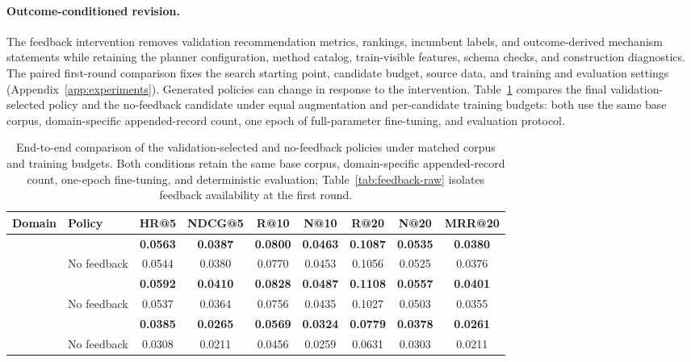 \paragraph{Outcome-conditioned revision.}
The feedback intervention removes validation recommendation metrics, rankings, incumbent labels, and outcome-derived mechanism statements while retaining the planner configuration, method catalog, train-visible features, schema checks, and construction diagnostics. The paired first-round comparison fixes the search starting point, candidate budget, source data, and training and evaluation settings (Appendix~\ref{app:experiments}). Generated policies can change in response to the intervention. Table~\ref{tab:no-feedback} compares the final validation-selected policy and the no-feedback candidate under equal augmentation and per-candidate training budgets: both use the same base corpus, domain-specific appended-record count, one epoch of full-parameter fine-tuning, and evaluation protocol.

\begin{table}[htbp]
\centering
\caption{End-to-end comparison of the validation-selected and no-feedback policies under matched corpus and training budgets. Both conditions retain the same base corpus, domain-specific appended-record count, one-epoch fine-tuning, and deterministic evaluation; Table~\ref{tab:feedback-raw} isolates feedback availability at the first round.}
\label{tab:no-feedback}
\small
\begin{tabular}{llccccccc}
\hline
Domain & Policy & HR@5 & NDCG@5 & R@10 & N@10 & R@20 & N@20 & MRR@20 \\
\hline
\rowcolor{methodblue}\multirow[c]{2}{*}{Beauty} & \method{}    &\textbf{0.0563}&\textbf{0.0387}&\textbf{0.0800}&\textbf{0.0463}&\textbf{0.1087}&\textbf{0.0535}&\textbf{0.0380}\\
       & No feedback & 0.0544 & 0.0380 & 0.0770 & 0.0453 & 0.1056 & 0.0525 & 0.0376 \\
\rowcolor{methodblue}\multirow[c]{2}{*}{Toys}   & \method{}    &\textbf{0.0592}&\textbf{0.0410}&\textbf{0.0828}&\textbf{0.0487}&\textbf{0.1108}&\textbf{0.0557}&\textbf{0.0401}\\
       & No feedback & 0.0537 & 0.0364 & 0.0756 & 0.0435 & 0.1027 & 0.0503 & 0.0355 \\
\rowcolor{methodblue}\multirow[c]{2}{*}{Sports} & \method{}    &\textbf{0.0385}&\textbf{0.0265}&\textbf{0.0569}&\textbf{0.0324}&\textbf{0.0779}&\textbf{0.0378}&\textbf{0.0261}\\
       & No feedback & 0.0308 & 0.0211 & 0.0456 & 0.0259 & 0.0631 & 0.0303 & 0.0211 \\
\hline
\end{tabular}
\end{table}

